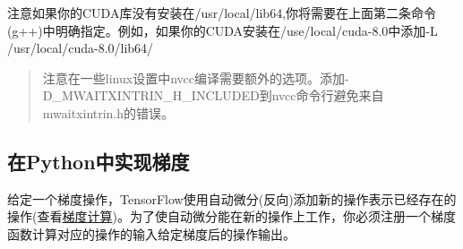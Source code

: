 注意如果你的CUDA库没有安装在/usr/local/lib64,你将需要在上面第二条命令(g++)中明确指定。例如，如果你的CUDA安装在/use/local/cuda-8.0中添加-L /usr/local/cuda-8.0/lib64/
\begin{quote}
注意在一些linux设置中nvcc编译需要额外的选项。添加-D\_MWAITXINTRIN\_H\_INCLUDED到nvcc命令行避免来自mwaitxintrin.h的错误。
\end{quote}
\subsection{在Python中实现梯度}
给定一个梯度操作，TensorFlow使用自动微分(反向)添加新的操作表示已经存在的操作(查看\href{https://www.tensorflow.org/api_guides/python/train?hl=zh-cn#gradient_computation}{梯度计算})。为了使自动微分能在新的操作上工作，你必须注册一个梯度函数计算对应的操作的输入给定梯度后的操作输出。

